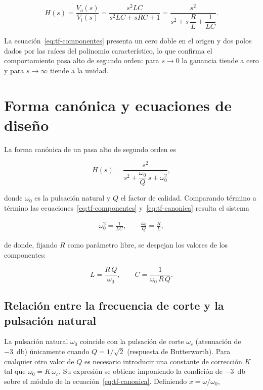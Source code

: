 \begin{equation}
  H(s) = \frac{V_o(s)}{V_i(s)} = \frac{s^2 LC}{s^2 LC + sRC + 1}
       = \frac{s^2}{s^2 + s\,\dfrac{R}{L} + \dfrac{1}{LC}}.
  \label{eq:tf-componentes}
\end{equation}

La ecuación~\eqref{eq:tf-componentes} presenta un cero doble en el origen y dos polos dados por las raíces
del polinomio característico, lo que confirma el comportamiento pasa alto de segundo orden: para $s \to 0$
la ganancia tiende a cero y para $s \to \infty$ tiende a la unidad.

\section{Forma canónica y ecuaciones de diseño}

La forma canónica de un pasa alto de segundo orden es

\begin{equation}
  H(s) = \frac{s^2}{s^2 + \dfrac{\omega_0}{Q}\, s + \omega_0^2},
  \label{eq:tf-canonica}
\end{equation}

donde $\omega_0$ es la pulsación natural y $Q$ el factor de calidad. Comparando término a término las
ecuaciones~\eqref{eq:tf-componentes} y~\eqref{eq:tf-canonica} resulta el sistema

\begin{gather*}
  \omega_0^2 = \frac{1}{LC}, \qquad \frac{\omega_0}{Q} = \frac{R}{L},
\end{gather*}

de donde, fijando $R$ como parámetro libre, se despejan los valores de los componentes:

\begin{equation}
  L = \frac{R\,Q}{\omega_0}, \qquad C = \frac{1}{\omega_0\, R\, Q}.
  \label{eq:diseno-LC}
\end{equation}

\subsection{Relación entre la frecuencia de corte y la pulsación natural}

La pulsación natural $\omega_0$ coincide con la pulsación de corte $\omega_c$ (atenuación de
\qty{-3}{\decibel}) únicamente cuando $Q = 1/\sqrt{2}$ (respuesta de Butterworth). Para cualquier otro valor
de $Q$ es necesario introducir una constante de corrección $K$ tal que $\omega_0 = K\,\omega_c$. Su
expresión se obtiene imponiendo la condición de \qty{-3}{\decibel} sobre el módulo de la
ecuación~\eqref{eq:tf-canonica}. Definiendo $x = \omega/\omega_0$,

